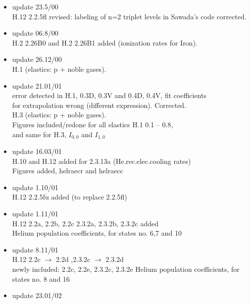 \documentclass[12pt,dvipdfmx]{article}
\begin{document}
\begin{itemize}
  new: ratio of population coeff. p(6)/p(1)\\
  H.12 7.2e added                            \\
  H.12 2.2.14e added                          \\
  H.12 2.2.5e added. Former 2.2.5e (Fulcher emissivity) is now:
                            2.2.5fl\\
  H.12 2.1.5e added. Former 2.1.5e (del-e) is now: 2.1.5de \\
  H.12 2.1.8e added. Former 2.1.8e (del-e) is now: 2.1.8de
 \item update  23.5/00 \\
  H.12 2.2.5fl revised: labeling of n=2 triplet levels in Sawada's
  code corrected.
 \item update  06.8/00 \\
  H.2 2.26B0 and H.2 2.26B1 added (ionization rates for Iron).
 \item update  26.12/00 \\
  H.1 (elastics: p + noble gases).
 \item update  21.01/01 \\
  error detected in H.1, 0.3D, 0.3V and 0.4D, 0.4V, fit coefficients\\
  for extrapolation wrong (different expression). Corrected.\\
  H.3 (elastics: p + noble gases).\\
  Figures included/redone for all elastics H.1  0.1 -- 0.8, \\
  and same for H.3, $I_{0,0}$ and $I_{1,0}$
 \item update  16.03/01 \\
  H.10 and H.12 added for 2.3.13a (He.rec.elec.cooling rates)\\
  Figures added, helraecr and helraecc
 \item update  1.10/01 \\
  H.12  2.2.5fu added (to replace 2.2.5fl)
 \item update  1.11/01 \\
  H.12  2.2a, 2.2b, 2.2c 2.3.2a, 2.3.2b, 2.3.2c added \\
  Helium population coefficients, for states no. 6,7 and 10
 \item update  8.11/01 \\
  H.12  2.2c $\rightarrow$ 2.2d ,2.3.2c $\rightarrow$ 2.3.2d \\
  newly included: 2.2c, 2.2e,  2.3.2c,  2.3.2e
  Helium population coefficients, for states no. 8 and 16
 \item update  23.01/02 \\

\end{itemize}
\end{document}

